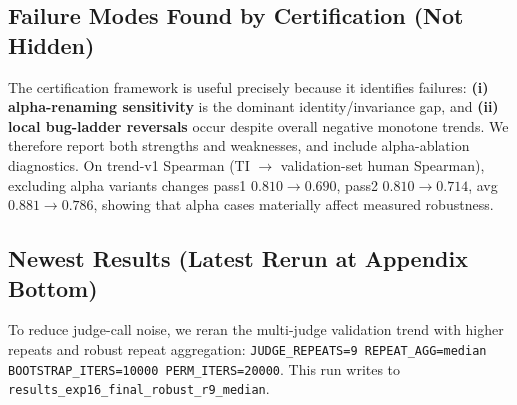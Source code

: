 \documentclass{article}
\begin{document}
\begin{table}[t]
  \centering
  \small
  \caption{\textbf{Leanstral remains low-alignment under multiple index constructions.}
    Re-aggregation improves over the arithmetic baseline in some splits, but all three settings remain near-zero or negative.
    This suggests the bottleneck is likely the underlying judge behavior for this ranking task (human-preference alignment), not only index form.
    One plausible hypothesis is that Leanstral is stronger for Lean proof editing/generation than for pairwise judging assessed against human ratings under this rubric; we treat this as a testable conjecture, not a final causal claim.}
  \label{tab:app-leanstral-index-reagg}
\end{table}

\subsection{Failure Modes Found by Certification (Not Hidden)}
The certification framework is useful precisely because it identifies failures:
\textbf{(i) alpha-renaming sensitivity} is the dominant identity/invariance gap,
and \textbf{(ii) local bug-ladder reversals} occur despite overall negative monotone trends.
We therefore report both strengths and weaknesses, and include alpha-ablation diagnostics.
On trend-v1 Spearman (TI \(\rightarrow\) validation-set human Spearman), excluding alpha variants changes
pass1 \(0.810\rightarrow0.690\), pass2 \(0.810\rightarrow0.714\), avg \(0.881\rightarrow0.786\),
showing that alpha cases materially affect measured robustness.

\subsection{Newest Results (Latest Rerun at Appendix Bottom)}
To reduce judge-call noise, we reran the multi-judge validation trend with higher repeats and robust repeat aggregation:
\texttt{JUDGE\_REPEATS=9 REPEAT\_AGG=median BOOTSTRAP\_ITERS=10000 PERM\_ITERS=20000}.
This run writes to \texttt{results\_exp16\_final\_robust\_r9\_median}.
\end{document}
